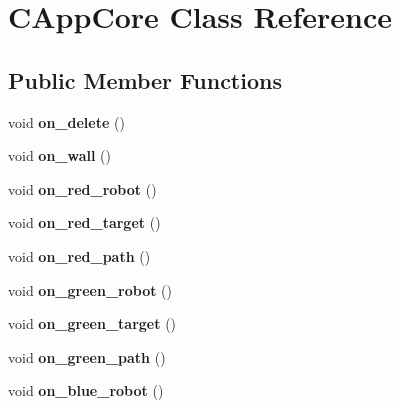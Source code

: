 \hypertarget{classCAppCore}{\section{C\-App\-Core Class Reference}
\label{classCAppCore}
}
\subsection*{Public Member Functions}
\begin{DoxyCompactItemize}
\item 
\hypertarget{classCAppCore_a96423a3af586771a52f3c61b537a2853}{void {\bfseries on\-\_\-delete} ()}\label{classCAppCore_a96423a3af586771a52f3c61b537a2853}

\item 
\hypertarget{classCAppCore_acf04a5ce23252208bdb77c132e0880ab}{void {\bfseries on\-\_\-wall} ()}\label{classCAppCore_acf04a5ce23252208bdb77c132e0880ab}

\item 
\hypertarget{classCAppCore_aba6ac7e5d40f28361313eac033e36d4b}{void {\bfseries on\-\_\-red\-\_\-robot} ()}\label{classCAppCore_aba6ac7e5d40f28361313eac033e36d4b}

\item 
\hypertarget{classCAppCore_a801a321e87e5500ee9b28bde9afd9e88}{void {\bfseries on\-\_\-red\-\_\-target} ()}\label{classCAppCore_a801a321e87e5500ee9b28bde9afd9e88}

\item 
\hypertarget{classCAppCore_a36f4427de8f00fa4306fdf4840c41647}{void {\bfseries on\-\_\-red\-\_\-path} ()}\label{classCAppCore_a36f4427de8f00fa4306fdf4840c41647}

\item 
\hypertarget{classCAppCore_a7354799f2e276542afd6791a132ec044}{void {\bfseries on\-\_\-green\-\_\-robot} ()}\label{classCAppCore_a7354799f2e276542afd6791a132ec044}

\item 
\hypertarget{classCAppCore_a3c7e2bed79f742da3b18d43216a1b482}{void {\bfseries on\-\_\-green\-\_\-target} ()}\label{classCAppCore_a3c7e2bed79f742da3b18d43216a1b482}

\item 
\hypertarget{classCAppCore_a3af48219a3faf428cd6664b79c61cb2d}{void {\bfseries on\-\_\-green\-\_\-path} ()}\label{classCAppCore_a3af48219a3faf428cd6664b79c61cb2d}

\item 
\hypertarget{classCAppCore_ae58d131f81d232db9bb65d9b66930f50}{void {\bfseries on\-\_\-blue\-\_\-robot} ()}\label{classCAppCore_ae58d131f81d232db9bb65d9b66930f50}


\end{DoxyCompactItemize}
